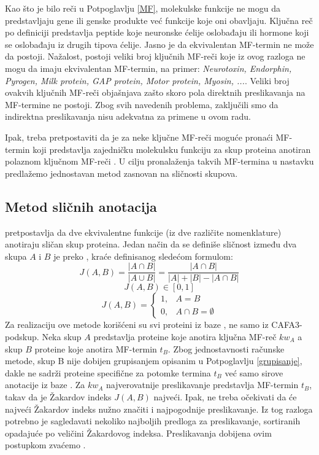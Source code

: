 Kao što je bilo reči u Potpoglavlju \ref{MF}, molekulske funkcije ne mogu da
predstavljaju gene ili genske produkte već funkcije koje oni obavljaju. Ključna
reč  po definiciji predstavlja peptide koje neuronske
ćelije oslobađaju ili hormone koji se oslobađaju iz drugih tipova ćelije. Jasno
je da ekvivalentan MF-termin ne može da postoji.  Nažalost, postoji veliki broj
ključnih MF-reči  koje iz ovog razloga ne mogu da imaju ekvivalentan MF-termin,
na primer: \textit{ Neurotoxin, Endorphin, Pyrogen, Milk protein, GAP protein,
Motor protein, Myosin, ...}. Veliki broj ovakvih ključnih MF-reči  objašnjava 
zašto skoro pola direktnih preslikavanja na MF-termine ne postoji.  Zbog svih
navedenih problema, zaključili smo da indirektna preslikavanja nisu adekvatna za
primene u ovom radu.

Ipak, treba pretpostaviti da je za neke ključne MF-reči moguće pronaći MF-termin
koji predstavlja zajedničku molekulsku funkciju za skup proteina anotiran
polaznom ključnom MF-reči .  U cilju pronalaženja takvih MF-termina u nastavku
predlažemo jednostavan metod zasnovan na sličnosti skupova.

\subsection{Metod sličnih anotacija}

 pretpostavlja da dve ekvivalentne funkcije (iz dve
različite nomenklature) anotiraju sličan skup proteina.  Jedan način da se
definiše sličnost između dva skupa $A$ i $B$ je preko 
, kraće   definisanog sledećom formulom:
$$J(A,B) = \dfrac{|A \cap B|}{|A \cup B|} =  \dfrac{|A \cap B|}{|A|+|B|-|A \cap B|}$$
$$  J(A,B) \in [0, 1] $$
\[   
  J(A,B) = 
    \begin{cases}
      1,&A=B  \\
      0,&A\cap B=\emptyset
    \end{cases}
\]
Za realizaciju ove metode korišćeni su svi proteini iz baze \swissprot, ne samo iz
CAFA3-podskup.  Neka skup $A$ predstavlja proteine koje anotira ključna MF-reč  $kw_A$
a skup $B$ proteine koje anotira MF-termin $t_B$.  Zbog jednostavnosti računske
metode, skup B nije dobijen grupisanjem opisanim u Potpoglavlju
\ref{grupisanje}, dakle ne sadrži proteine specifične za potomke termina $t_B$
već samo sirove anotacije iz baze \swissprot.  Za $kw_A$ najverovatnije
preslikavanje predstavlja MF-termin $t_B$, takav da je Žakardov indeks $J(A,B)$
najveći.  Ipak, ne treba očekivati da će najveći Žakardov indeks nužno značiti
i najpogodnije preslikavanje. Iz tog razloga potrebno je  sagledavati nekoliko
najboljih predloga za preslikavanje, sortiranih opadajuće po veličini
Žakardovog indeksa. Preslikavanja dobijena ovim postupkom zvaćemo
.

